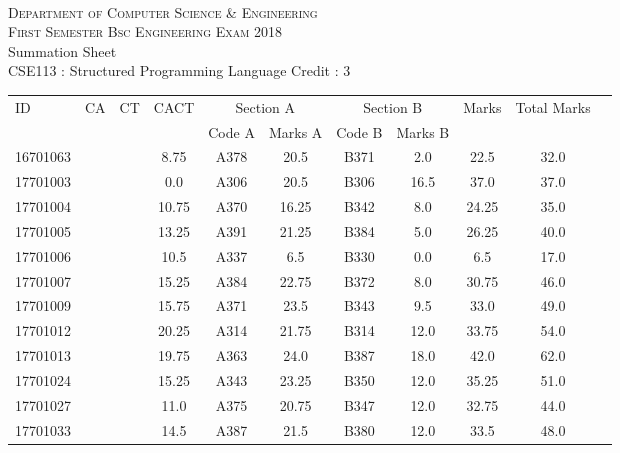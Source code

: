 \documentclass[12pt]{article}
\begin{document}
    \centering
    \begin{minipage}[m]{.8\textwidth} \centering 
	\smallskip
	\\
	\textsc{Department of Computer Science \& Engineering}\\
	\textsc{ First Semester Bsc Engineering Exam 2018}\\
    {\large {\sc Summation Sheet}}\\  
     {\centering CSE113 : Structured Programming Language     Credit : 3 } \\
    \end{minipage} 
    \begin{center} 
	\renewcommand{\arraystretch}{1.08}
	\begin{small}
    \begin{tabular}{|l|c|c|c|c|c|c|c|c|c|c|} \hline
	\multirow{2}{*}{ID} & 	\multirow{2}{*}{CA}  & 	\multirow{2}{*}{CT}  & 	\multirow{2}{*}{CACT}  & \multicolumn{2 }{c|}{Section A}& \multicolumn{2 }{c|}{Section B} & 	\multirow{2}{*}{Marks}  & 	\multirow{2}{*}{Total Marks}  \\ 
	&  &  &  & Code A & Marks A & Code B & Marks B&  &  \\ \hline
16701063 &  &  & 8.75 & A378 & 20.5 & B371 & 2.0 & 22.5 & 32.0\\ \hline 
17701003 &  &  & 0.0 & A306 & 20.5 & B306 & 16.5 & 37.0 & 37.0\\ \hline 
17701004 &  &  & 10.75 & A370 & 16.25 & B342 & 8.0 & 24.25 & 35.0\\ \hline 
17701005 &  &  & 13.25 & A391 & 21.25 & B384 & 5.0 & 26.25 & 40.0\\ \hline 
17701006 &  &  & 10.5 & A337 & 6.5 & B330 & 0.0 & 6.5 & 17.0\\ \hline 
17701007 &  &  & 15.25 & A384 & 22.75 & B372 & 8.0 & 30.75 & 46.0\\ \hline 
17701009 &  &  & 15.75 & A371 & 23.5 & B343 & 9.5 & 33.0 & 49.0\\ \hline 
17701012 &  &  & 20.25 & A314 & 21.75 & B314 & 12.0 & 33.75 & 54.0\\ \hline 
17701013 &  &  & 19.75 & A363 & 24.0 & B387 & 18.0 & 42.0 & 62.0\\ \hline 
17701024 &  &  & 15.25 & A343 & 23.25 & B350 & 12.0 & 35.25 & 51.0\\ \hline 
17701027 &  &  & 11.0 & A375 & 20.75 & B347 & 12.0 & 32.75 & 44.0\\ \hline 
17701033 &  &  & 14.5 & A387 & 21.5 & B380 & 12.0 & 33.5 & 48.0\\ \hline 

\end{tabular}
\end{small}
\end{center}
\end{document}
